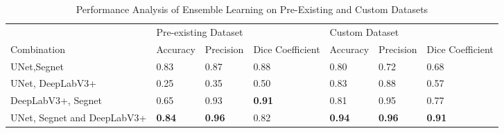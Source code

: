\begin{table}[htbp]
    \centering
    \caption{Performance Analysis of Ensemble Learning on Pre-Existing and Custom Datasets}
    
    \begin{tabular}{p{.14\linewidth}p{.12\linewidth}p{.12\linewidth}p{.11\linewidth}p{.12\linewidth}p{.12\linewidth}p{.11\linewidth}}
    \hline
    \textbf{ }&
    \multicolumn{3}{l}{Pre-existing Dataset} & \multicolumn{3}{l}{Custom Dataset}\\
    \cline{1-7}
    Combination & Accuracy & Precision & Dice Coefficient  & Accuracy & Precision & Dice Coefficient  \\
        \hline
        UNet,Segnet & 0.83 & 0.87 & 0.88 & 0.80 & 0.72 & 0.68\\%
        UNet, DeepLabV3+ & 0.25 & 0.35 & 0.50 & 0.83 & 0.88 & 0.57 \\ %
        DeepLabV3+, Segnet & 0.65 & 0.93 & \textbf{0.91} & 0.81 & 0.95 & 0.77 \\ %
        UNet, Segnet and DeepLabV3+& \textbf{0.84} & \textbf{0.96} & 0.82 & \textbf{0.94} & \textbf{0.96} & \textbf{0.91} \\
        \hline
    \end{tabular}
    
    \label{table4}
\end{table}


